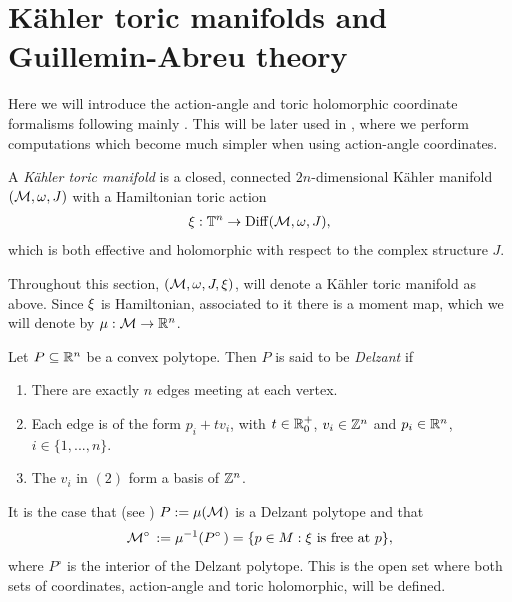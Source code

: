 \documentclass[notas.tex]{subfiles}
\begin{document}
\section{Kähler toric manifolds and Guillemin-Abreu theory} \label{sec_coordinates}

	Here we will introduce the action-angle and toric holomorphic coordinate formalisms following mainly \cite{abreu_kahler_2003}. This will be later used in , where we perform computations which become much simpler when using action-angle coordinates.

	\begin{defn} \label{def_ktoric_action}
		A \emph{Kähler toric manifold} is a closed, connected $2n$-dimensional Kähler manifold $(\mathcal{M},\omega,J)$ with a Hamiltonian toric action
		\begin{align*}
			\xi:\mathbb{T}^n\to\operatorname*{Diff}(\mathcal{M},\omega,J),
		\end{align*}
		which is both effective and holomorphic with respect to the complex structure $J$.
	\end{defn}

	Throughout this section, $(\mathcal{M},\omega,J,\xi)$, will denote a Kähler toric manifold as above. Since $\xi$ is Hamiltonian, associated to it there is a moment map, which we will denote by $\mu: \mathcal{M} \to \mathbb{R}^n$. 
	\begin{defn}
		Let $P \subseteq \mathbb{R}^n$ be a convex polytope. Then $P$ is said to be \emph{Delzant} if 
		\begin{enumerate}
			\item There are exactly $n$ edges meeting at each vertex.
			\item Each edge is of the form $p_i+tv_i$, with $t \in \mathbb{R}^+_0$, $v_i \in \mathbb{Z}^n$ and $p_i \in \mathbb{R}^n$, $i \in \{1,...,n\}$.
			\item The $v_i$ in $(2)$ form a basis of $\mathbb{Z}^n$.
		\end{enumerate}
	\end{defn}
	It is the case that (see \cite{delzant_hamiltoniens_1988}) $P := \mu(\mathcal{M})$ is a Delzant polytope and that
	\begin{align} \label{eq_open_free_set}
		\mfld^\circ := \mmap^{-1}(\poly^\circ) = \{p \in M: \tact \text{ is free at }p\},
	\end{align}
	where $P^\circ$ is the interior of the Delzant polytope. This is the open set where both sets of coordinates, action-angle and toric holomorphic, will be defined.
\end{document}
